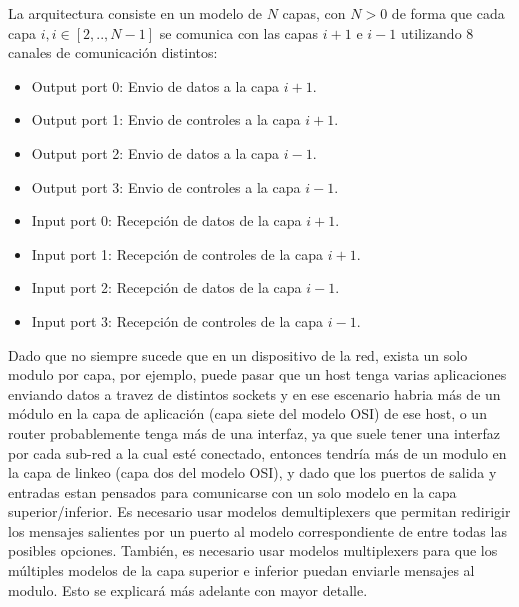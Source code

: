 \documentclass[10pt,a4paper]{article}
\begin{document}
La arquitectura consiste en un modelo de $N$ capas, con $N > 0$ de forma que cada capa $i, i \in [2,..,N-1]$ se comunica con las capas $i+1$ e $i-1$ utilizando $8$ canales de comunicación distintos:

\begin{itemize}
\item Output port 0: Envio de datos a la capa $i+1$.
\item Output port 1: Envio de controles a la capa $i+1$.
\item Output port 2: Envio de datos a la capa $i-1$.
\item Output port 3: Envio de controles a la capa $i-1$.
\item Input port 0: Recepción de datos de la capa $i+1$.
\item Input port 1: Recepción de controles de la capa $i+1$.
\item Input port 2: Recepción de datos de la capa $i-1$.
\item Input port 3: Recepción de controles de la capa $i-1$.
\end{itemize}

Dado que no siempre sucede que en un dispositivo de la red, exista un solo modulo por capa, por ejemplo, puede pasar que un host tenga varias aplicaciones enviando datos a travez de distintos sockets y en ese escenario habria más de un módulo en la capa de aplicación (capa siete del modelo OSI) de ese host, o un router probablemente tenga más de una interfaz, ya que suele tener una interfaz por cada sub-red a la cual esté conectado, entonces tendría más de un modulo en la capa de linkeo (capa dos del modelo OSI), y dado que los puertos de salida y entradas estan pensados para comunicarse con un solo modelo en la capa superior/inferior. Es necesario usar modelos demultiplexers que permitan redirigir los mensajes salientes por un puerto al modelo correspondiente de entre todas las posibles opciones. También, es necesario usar modelos multiplexers para que los múltiples modelos de la capa superior e inferior puedan enviarle mensajes al modulo. Esto se explicará más adelante con mayor detalle.
\end{document}
